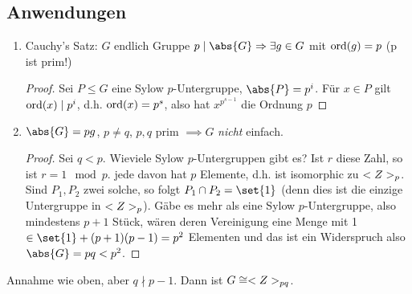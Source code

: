 \subsection*{Anwendungen}
\begin{enumerate}
	\item Cauchy's Satz: $G$ endlich Gruppe $p \mid \abs{G} \implies \exists g \in G$ mit $\operatorname{ord}(g) = p$ (p ist prim!)
	\begin{proof}
		Sei $P \le G$ eine Sylow $p$-Untergruppe, $\abs{P} = p^i$. Für $x \in P$ gilt $\operatorname{ord}(x) \mid p^{i}$, d.h. $\operatorname{ord}(x) = p^s$, also hat $x^{p^{s-1}}$ die Ordnung $p$
	\end{proof}
	\item $\abs{G} = pg$, $p\neq q$, $p,q$ prim $\implies G$ \emph{nicht} einfach.
	\begin{proof}
		Sei $q < p$. Wieviele Sylow $p$-Untergruppen gibt es? Ist $r$ diese Zahl, so ist $r=1 \mod p$. jede davon hat $p$ Elemente, d.h. ist isomorphic zu $<Z>_p$. Sind $P_1, P_2$ zwei solche, so folgt $P_1 \cap P_2 = \set{1}$ (denn dies ist die einzige Untergruppe in $<Z>_p$). Gäbe es mehr als eine Sylow $p$-Untergruppe, also mindestens $p+1$ Stück, wären deren Vereinigung eine Menge mit 1 $\in \set{1} + (p+1)(p-1) = p^2$ Elementen und das ist ein Widerspruch also $\abs{G} = pq < p^2$.
	\end{proof}
\end{enumerate}
\begin{proposition}
	Annahme wie oben, aber $q \nmid p-1$. Dann ist $G \cong <Z>_{pq}$.
\end{proposition}
